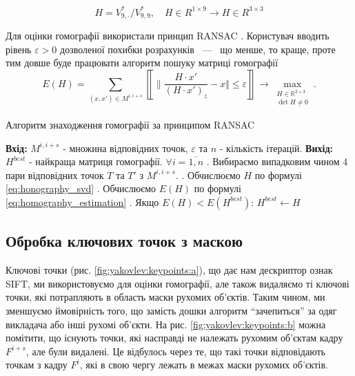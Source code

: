 \begin{equation}
    H = V^{*}_{9,\cdot }/V^{*}_{9,9},\quad H \in R^{1 \times 9} \rightarrow H \in R^{3 \times 3}
    \label{eq:honography_svd}
\end{equation}

Для оцінки гомографії використали принцип RANSAC \cite{ransac}.
Користувач вводить рівень \(\varepsilon > 0\)
дозволеної похибки розрахунків ~---~ що менше, то краще, проте тим довше
буде працювати алгоритм пошуку матриці гомографії
\begin{equation}
    E(H) = \sum_{(x,x') \in M^{i,i+s}}
    \left\llbracket \|
    \frac{H\cdot x'}{(H\cdot x')_z} - x
    \Vert \leq \varepsilon
    \right\rrbracket
    \to \max\limits_{\substack{H \in \mathbb{R}^{3 \times 3} \\ \det{H} \neq 0}}.
    \label{eq:homography_estimation}
\end{equation}

\begin{algorithm}[H]
    \caption{Алгоритм знаходження гомографії за принципом RANSAC}
    \begin{algorithmic}
        \State \textbf{Вхід:} $M^{i,i+s}$ - множина відповідних точок, $\varepsilon$ та $n$ - кількість ітерацій.
        \State \textbf{Вихід:} $H^{best}$ - найкраща матриця гомографії.
        \State $\forall i = \overline{1,n}$
        \State {}. Вибираємо випадковим чином 4 пари відповідних точок $T$ та $T'$ з $M^{i,i+s}$.
        \State {}. Обчислюємо $H$ по формулі \eqref{eq:honography_svd}
        \State {}. Обчислюємо $E(H)$ по формулі \eqref{eq:homography_estimation}
        \State {}. Якщо  $E(H) < E(H^{best})$:
        \State \qquad $H^{best} \gets H$
    \end{algorithmic}
\end{algorithm}

\subsection{Обробка ключових точок з маскою}

Ключові точки (рис. \ref{fig:yakovlev:keypoints:a}), що дає нам дескриптор ознак SIFT, ми
використовуємо для оцінки гомографії, але також видаляємо ті ключові
точки, які потрапляють в область маски рухомих об'єктів.
Таким чином, ми зменшуємо ймовірність того, що замість дошки алгоритм ``зачепиться'' за одяг
викладача або інші рухомі об'єкти. На рис. \ref{fig:yakovlev:keypoints:b} можна помітити, що
існують точки, які насправді не належать рухомим об'єктам кадру
\(F^{i + s}\), але були видалені. Це відбулось через те, що такі точки
відповідають точкам з кадру \(F^{i}\), які в свою чергу лежать в межах маски рухомих об'єктів.


